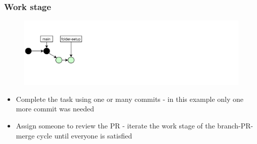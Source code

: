 \documentclass[aspectratio=169]{beamer} %
\begin{document}
\begin{frame}
	\frametitle{Work stage}

	\vspace{-.5cm}
	\begin{minipage}[t][5cm][t]{\textwidth}
		\begin{figure}
			\centering
			\includegraphics[width=\textwidth]{./img/dime-gitflow-network-1-2.png}
		\end{figure}
	\end{minipage}

	\vspace{-.5cm}
	\begin{minipage}[t][5cm][t]{\textwidth}
		\begin{itemize}
			\setlength\itemsep{.5em}
			\item Complete the task using one or many commits
			- in this example only one more commit was needed
			\item Assign someone to review the PR
			- iterate the work stage of the branch-PR-merge cycle until everyone is satisfied
		\end{itemize}
	\end{minipage}

\end{frame}
\end{document}
